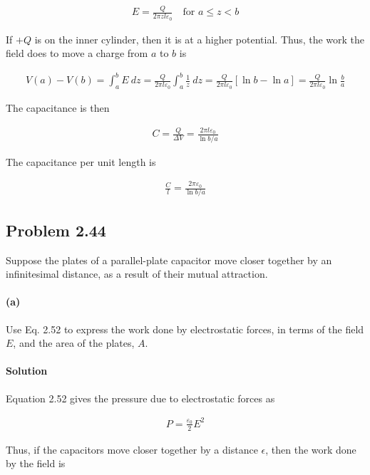 \documentclass{article}
\begin{document}
\begin{align*}
    E = \frac{Q}{2\pi z l \varepsilon_0} \quad \text{for } a\leq z < b
\end{align*}

If $+Q$ is on the inner cylinder, then it is at a higher potential. Thus, the work the field does to move a charge from $a$ to $b$ is

\begin{align*}
    V(a) - V(b) = \int_{a}^{b} E\ dz = \frac{Q}{2\pi l\varepsilon_0}\int_a^b \frac{1}{z}\ dz = \frac{Q}{2\pi l\varepsilon_0}\left[ \ln{b} - \ln{a} \right] = \frac{Q}{2\pi l\varepsilon_0}\ln\frac{b}{a}
\end{align*}

The capacitance is then 

\begin{align*}
    C = \frac{Q}{\Delta V} = \frac{2\pi l \varepsilon_0}{\ln{b/a}}
\end{align*}

The capacitance per unit length is 

\begin{align*}
    \frac{C}{l} = \frac{2\pi\varepsilon_0}{\ln{b/a}}
\end{align*}

\newpage

\subsection*{Problem 2.44}
 Suppose the plates of a parallel-plate capacitor move closer together
 by an infinitesimal distance, as a result of their mutual attraction.

\paragraph{(a)} Use Eq. 2.52 to express the work done by electrostatic forces, in terms of the field $E$, and the area of the plates, $A$.

\paragraph{Solution} Equation 2.52 gives the pressure due to electrostatic forces as 

\begin{align*}
    P = \frac{\varepsilon_0}{2}E^2
\end{align*}

Thus, if the capacitors move closer together by a distance $\epsilon$, then the work done by the field is 
\end{document}
